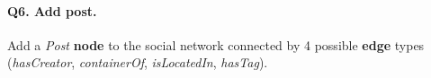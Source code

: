 \paragraph{\textbf{Q6}. Add post.}
Add a \emph{Post} \textbf{node} to the social network connected by 4
possible \textbf{edge} types (\emph{hasCreator}, \emph{containerOf},
\emph{isLocatedIn}, \emph{hasTag}).
